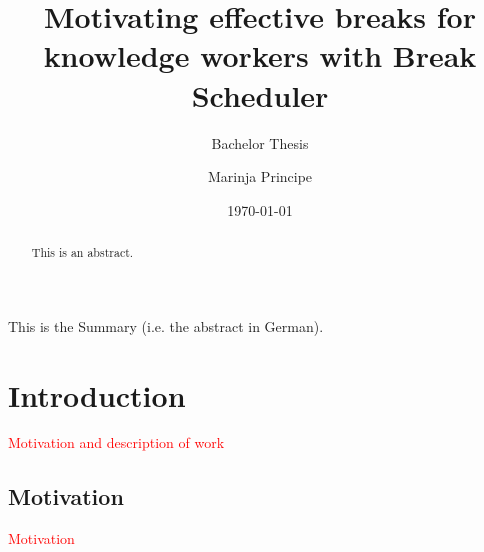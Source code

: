 \documentclass{hasel_thesis}
\date{\today}
\title{Motivating effective breaks for knowledge workers with Break  Scheduler }
\subtitle{Bachelor Thesis}
\author{Marinja Principe}
\begin{document}
\maketitle

\frontmatter

\begin{acknowledgements}
\end{acknowledgements}

\begin{abstract}
This is an abstract.
\end{abstract}

\begin{Zusammenfassung}
This is the Summary (i.e. the abstract in German).
\end{Zusammenfassung}
    

\tableofcontents
\listoffigures
\listoftables
\lstlistoflistings

\mainmatter
\chapter{Introduction}

\textcolor{red}{Motivation and description of work}

\section{Motivation}

\textcolor{red}{Motivation}

\end{document}
